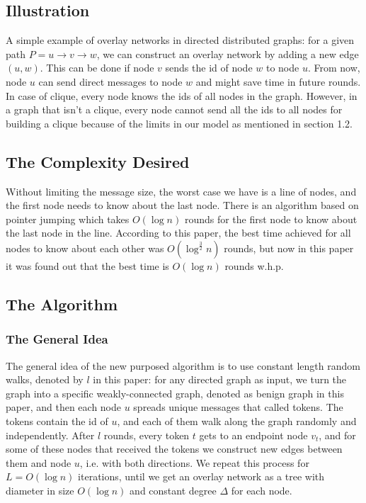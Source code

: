 \documentclass[11pt]{article}
\begin{document}
\subsection{Illustration}
A simple example of overlay networks in directed distributed graphs: for a given path $P=u\rightarrow v \rightarrow w$, we can construct an overlay network by adding a new edge $(u,w)$. This can be done if node $v$ sends the id of node $w$ to node $u$. From now, node $u$ can send direct messages to node $w$ and might save time in future rounds. In case of clique, every node knows the ids of all nodes in the graph. However, in a graph that isn't a clique, every node cannot send all the ids to all nodes for building a clique because of the limits in our model as mentioned in section 1.2.

\subsection{The Complexity Desired}
Without limiting the message size, the worst case we have is a line of nodes, and the first node needs to know about the last node. There is an algorithm based on pointer jumping which takes $O(\log{n})$ rounds for the first node to know about the last node in the line. According to this paper, the best time achieved for all nodes to know about each other was $O(\log^{\frac{3}{2}}n)$ rounds, but now in this paper it was found out that the best time is $O(\log{n})$ rounds w.h.p.

\subsection{The Algorithm}
\subsubsection{The General Idea}
The general idea of the new purposed algorithm is to use constant length random walks, denoted by $l$ in this paper: for any directed graph as input, we turn the graph into a specific weakly-connected graph, denoted as benign graph in this paper, and then each node $u$ spreads unique messages that called tokens. The tokens contain the id of $u$, and each of them walk along the graph randomly and independently. After $l$ rounds, every token $t$ gets to an endpoint node $v_{t}$, and for some of these nodes that received the tokens we construct new edges between them and node $u$, i.e. with both directions. We repeat this process for $L=O(\log{n})$ iterations, until we get an overlay network as a tree with diameter in size $O(\log{n})$ and constant degree $\Delta$ for each node.
\end{document}
